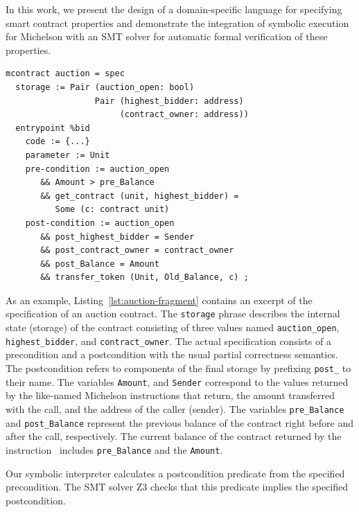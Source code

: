 \documentclass[a4paper,USenglish,cleveref, autoref, thm-restate]{lipics-v2021}
\begin{document}
In this work, we present the design of a domain-specific language for
specifying smart contract properties and demonstrate the integration
of symbolic execution for Michelson with an SMT solver for automatic
formal verification of these properties.

\begin{lstlisting}[float=tp,captionpos=b,caption={Auction contract specification (excerpt)},label={lst:auction-fragment}]
mcontract auction = spec 
  storage := Pair (auction_open: bool) 
                  Pair (highest_bidder: address)
                       (contract_owner: address))
  entrypoint %bid
    code := {...}
    parameter := Unit 
    pre-condition := auction_open 
       && Amount > pre_Balance 
       && get_contract (unit, highest_bidder) = 
          Some (c: contract unit)
    post-condition := auction_open
       && post_highest_bidder = Sender 
       && post_contract_owner = contract_owner 
       && post_Balance = Amount 
       && transfer_token (Unit, Old_Balance, c) ;
\end{lstlisting}
As an example, Listing~\ref{lst:auction-fragment} contains an excerpt
of the specification of an auction contract. The \texttt{storage}
phrase describes the internal state (storage) of the contract
consisting of three values named \lstinline|auction_open|,
\lstinline|highest_bidder|, and \lstinline|contract_owner|.
The actual specification consists of a precondition and a
postcondition with the usual partial correctness semantics. The
postcondition refers to components of the final storage by prefixing
\lstinline|post_| to their name. The variables
\lstinline|Amount|, and \lstinline|Sender| correspond to the values
returned by the like-named Michelson instructions that return, the amount transferred with the call, and the address of the caller (sender). The variables \lstinline|pre_Balance| and \lstinline|post_Balance| represent the previous balance of the contract right before and after the call, respectively. The current balance of the contract returned by the instruction \BALANCE\ includes \lstinline|pre_Balance| and the \lstinline|Amount|. 

Our symbolic interpreter calculates a postcondition predicate from the specified
precondition. The SMT solver Z3 \cite{z3} checks that this predicate
implies the specified postcondition.
\end{document}
